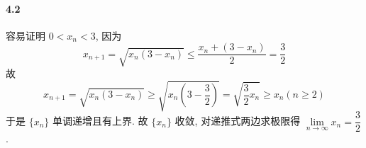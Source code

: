 \paragraph*{4.2}容易证明 $0<x_n<3$, 因为 
\[
    x_{n+1}=\sqrt{x_n(3-x_n)}\leq \dfrac{x_n+(3-x_n)}{2}=\dfrac{3}{2}
\]
故
\[
    x_{n+1}=\sqrt{x_n(3-x_n)}\geq \sqrt{x_n\left(3-\dfrac{3}{2}\right)}=\sqrt{\dfrac{3}{2}x_n}\geq x_n(n\geq 2)
\]
于是 $\{x_n\}$ 单调递增且有上界. 故 $\{x_n\}$ 收敛, 对递推式两边求极限得 $\lim\limits_{n\to\infty}x_n=\dfrac{3}{2}$.